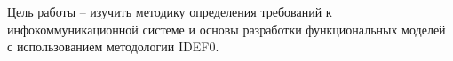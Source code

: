 Цель работы -- изучить методику определения требований к инфокоммуникационной
системе и основы разработки функциональных моделей с использованием методологии
IDEF0.
